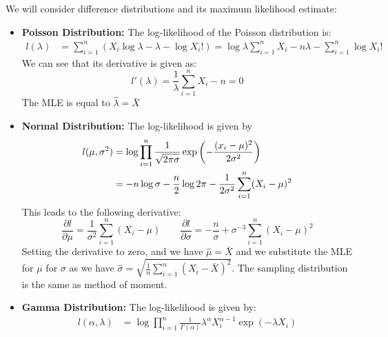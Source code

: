 \begin{example}
    We will consider difference distributions and its maximum likelihood estimate:
    \begin{itemize}
        \item \textbf{Poisson Distribution:} The log-likelihood of the Poisson distribution is:
        \begin{equation*}
        \begin{aligned}
            l(\lambda) &= \sum^n_{i=1}(X_i \log \lambda - \lambda - \log X_i!) = \log \lambda\sum^n_{i=1}X_i - n\lambda - \sum^n_{i=1}\log X_i!
        \end{aligned}
        \end{equation*}
        We can see that its derivative is given as:
        \begin{equation*}
            l'(\lambda) = \frac{1}{\lambda} \sum^n_{i=1}X_i -n = 0
        \end{equation*}
        The MLE is equal to $\hat{\lambda} = \bar{X}$
        \item \textbf{Normal Distribution:} The log-likelihood is given by 
        \begin{equation*}
        \begin{aligned}
            l(\mu, \sigma^2) &= \log \prod^n_{i=1}\frac{1}{\sqrt{2\pi\sigma}} \exp\left( -\frac{(x_i-\mu)^2}{2\sigma^2} \right)  \\
            &= -n\log\sigma - \frac{n}{2}\log2\pi - \frac{1}{2\sigma^2}\sum^n_{i=1}(X_i-\mu)^2
        \end{aligned}
        \end{equation*}
        This leads to the following derivative:
        \begin{equation*}
            \frac{\partial l}{\partial\mu} = \frac{1}{\sigma^2}\sum^n_{i=1}(X_i-\mu) \qquad \frac{\partial l}{\partial\sigma} = -\frac{n}{\sigma}+ \sigma^{-3}\sum^n_{i=1}(X_i - \mu)^2
        \end{equation*}
        Setting the derivative to zero, and we have $\hat{\mu} = \bar{X}$ and we substitute the MLE for $\mu$ for $\sigma$ as we have $\hat{\sigma} = \sqrt{\frac{1}{n}\sum^n_{i=1}(X_i-\bar{X})^2}$. The sampling distribution is the same as method of moment. 
        \item \textbf{Gamma Distribution:} The log-likelihood is given by:
        \begin{equation*}
        \begin{aligned}
            l(\alpha,\lambda) &= \log\prod^n_{i=1}\frac{1}{\Gamma(\alpha)}\lambda^\alpha X_i^{\alpha-1}\exp(-\lambda X_i) \\

\end{aligned}
\end{equation*}
\end{itemize}
\end{example}
